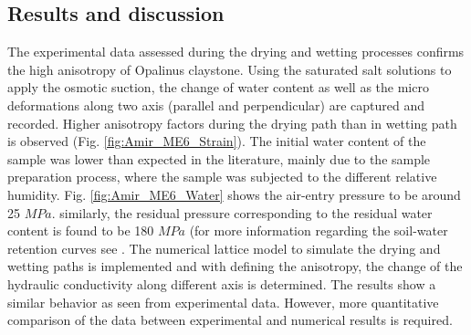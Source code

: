 \subsection{Results and discussion}
The experimental data assessed during the drying and wetting processes confirms the high anisotropy of Opalinus claystone. Using the saturated salt solutions to apply the osmotic suction, the change of water content as well as the micro deformations along two axis (parallel and perpendicular) are captured and recorded. Higher anisotropy factors during the drying path than in wetting path is observed (Fig. \ref{fig:Amir_ME6_Strain}). The initial water content of the sample was lower than expected in the literature, mainly due to the sample preparation process, where the sample was subjected to the different relative humidity. Fig. \ref{fig:Amir_ME6_Water} shows the air-entry pressure to be around 25 $MPa$. similarly, the residual pressure corresponding to the residual water content is found to be 180 $MPa$ (for more information regarding the soil-water retention curves see \cite{Sattari2020}. The numerical lattice model to simulate the drying and wetting paths is implemented and with defining the anisotropy, the change of the hydraulic conductivity along different axis is determined. The results show a similar behavior as seen from experimental data. However, more quantitative comparison of the data between experimental and numerical results is required. 